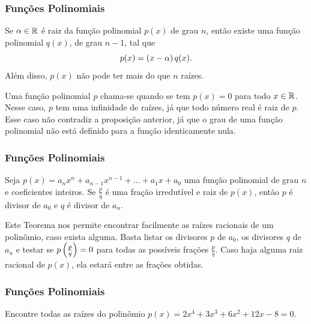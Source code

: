 \documentclass[brazil, notheorems, 10pt]{beamer}
\begin{document}

\begin{frame}
\frametitle{Funções Polinomiais} %
\begin{Prop}
Se $\alpha \in \mathbb{R}$ é raiz da função polinomial $p(x)$ de grau $n$,
então existe uma função polinomial $q(x)$, de grau $n-1$, tal que
$$p(x) = \left(x- \alpha\right)q(x).$$
Além disso, $p(x)$ não pode ter mais do que $n$ raízes.
\end{Prop}\pause

Uma função polinomial $p$ chama-se  quando
se tem $p(x) = 0$ para todo $x \in \mathbb{R}$. Nesse caso, $p$ tem uma
infinidade de raízes, já que todo número real é raiz de $p$. Esse
caso não contradiz a proposição anterior, já que o grau de uma
função polinomial não está definido para a função identicamente
nula.

\end{frame}



\begin{frame}
\frametitle{Funções Polinomiais} %
\begin{Teo}
Seja $p(x) = a_n x^n + a_{n-1} x^{n-1} + \dots + a_1 x + a_0$ uma função polinomial de grau $n$ e coeficientes inteiros. Se $\frac p q$ é uma fração irredutível e raiz de $p(x)$, então $p$ é divisor de $a_0$ e $q$ é divisor de $a_n$.
\end{Teo}\pause

Este Teorema nos permite encontrar facilmente as raízes racionais de um polinômio, caso exista alguma. Basta listar os divisores $p$ de $a_0$, os divisores $q$ de $a_n$ e testar se $p\left(\frac p q \right)=0$ para todas as possíveis frações $\frac p q$. Caso haja alguma raiz racional de $p(x)$, ela estará entre as frações obtidas.

\end{frame}


\begin{frame}
\frametitle{Funções Polinomiais} %

\begin{Exem}
Encontre todas as raízes do polinômio $p(x)=2x^4 +3x^3 +6x^2 +12x -8 = 0$.
\end{Exem}

\end{frame}
\end{document}
